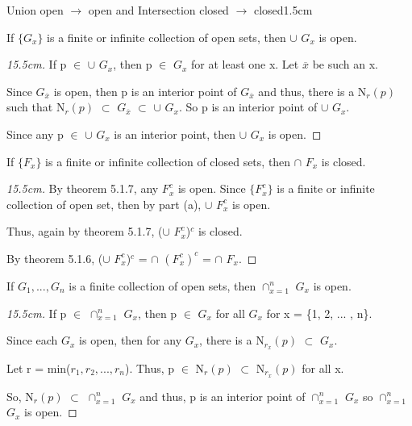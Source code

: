 	\begin{ltheorem}{Union open $\rightarrow$ open and
	Intersection closed $\rightarrow$ closed}{1.5cm}
		\item If $\{G_x\}$ is a finite or infinite collection of open sets,
		then $\cup$ $G_x$ is open.

			\begin{proof}[15.5cm]
				If p $\in$ $\cup$ $G_x$, then p $\in$ $G_x$ for at least one x.
				Let $\overline{x}$ be such an x.

				Since $G_{\overline{x}}$ is open, then p is an interior point of
				$G_{\overline{x}}$ and thus, there is a N$_r(p)$ such that
				N$_r(p)$ $\subset$ $G_{\overline{x}}$ $\subset$ $\cup$ $G_x$.
				So p is an interior point of $\cup$ $G_x$.

				Since any p $\in$ $\cup$ $G_x$ is an interior point, then
				$\cup$ $G_x$ is open.
			\end{proof}

		\item If $\{F_x\}$ is a finite or infinite collection of closed sets,
		then $\cap$ $F_x$ is closed.

			\begin{proof}[15.5cm]
				By {\color{red} theorem 5.1.7}, any $F_x^c$ is open.
				Since $\{F_x^c\}$ is a finite or infinite collection of
				open set, then by part (a), $\cup$ $F_x^c$ is open.

				Thus, again by {\color{red} theorem 5.1.7},
				($\cup$ $F_x^c$)$^c$ is closed.

				By {\color{red} theorem 5.1.6},
				($\cup$ $F_x^c$)$^c$ = $\cap$ $(F_x^c)^c$
				= $\cap$ $F_x$.
			\end{proof}

		\item If $G_1, ... , G_n$ is a finite collection of open sets,
		then $\cap_{x=1}^n$ $G_x$ is open.

			\begin{proof}[15.5cm]
				If p $\in$ $\cap_{x=1}^n$ $G_x$, then p $\in$ $G_x$ for
				all $G_x$ for x = \{1, 2, ... , n\}.

				Since each $G_x$ is open, then for any $G_x$, there is a
				N$_{r_x}(p)$ $\subset$ $G_x$.

				Let r = min($r_1, r_2 , ... , r_n$).
				Thus, p $\in$ N$_r(p)$ $\subset$ N$_{r_x}(p)$ for all x.

				So, N$_r(p)$ $\subset$ $\cap_{x=1}^n$ $G_x$ and thus,
				p is an interior point of $\cap_{x=1}^n$ $G_x$ so
				$\cap_{x=1}^n$ $G_x$ is open.


\end{proof}
\end{ltheorem}

